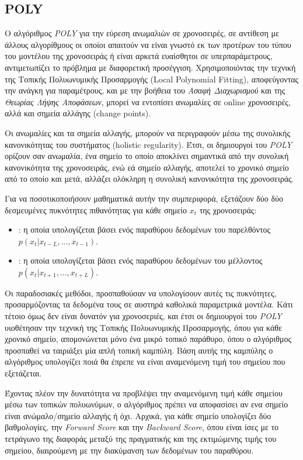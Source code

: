 \subsection{POLY}
Ο αλγόριθμος \emph{POLY} \cite{li2007unifying} για την εύρεση ανωμαλιών σε χρονοσειρές, σε αντίθεση με άλλους αλγορίθμους οι οποίοι απαιτούν να είναι γνωστό εκ των προτέρων του τύπου του μοντέλου της χρονοσειράς ή είναι αρκετά ευαίσθητοι σε υπερπαράμετρους, αντιμετωπίζει το πρόβλημα με διαφορετική προσέγγιση. Χρησιμοποιόντας την τεχνική της Τοπικής Πολυωνυμικής Προσαρμογής (Local Polynomial Fitting), αποφεύγοντας την ανάγκη για παραμέτρους, και με την βοήθεια του \emph{Ασαφή Διαχωρισμού} και της \emph{Θεωρίας Λήψης Αποφάσεων}, μπορεί να εντοπίσει ανωμαλίες σε online χρονοσειρές, αλλά και σημεία αλλάγης (change points).

Οι ανωμαλίες και τα σημεία αλλαγής, μπορούν να περιγραφούν μέσω της συνολικής κανονικότητας του συστήματος (holistic regularity). Έτσι, οι δημιουργοί του \emph{POLY} ορίζουν σαν ανωμαλία, ένα σημείο το οποίο αποκλίνει σημαντικά από την συνολική κανονικότητα της χρονοσειράς, ενώ εά σημείο αλλαγής, αποτελεί το χρονικό σημείο από το οποίο και μετά, αλλάζει ολόκληρη η συνολική κανονικότητα της χρονοσειράς.

Για να ποσοτικοποιήσουν μαθηματικά αυτήν την συμπεριφορά, εξετάζουν δύο δύο δεσμευμένες πυκνότητες πιθανότητας για κάθε σημείο $x_t$ της χρονοσειράς:
\begin{itemize}
    \item {}: η οποία υπολογίζεται βάσει ενός παραθύρου δεδομένων του παρελθόντος $p(x_t|x_{t-L},...,x_{t-1})$.
    \item {}: η οποία υπολογίζεται βάσει ενός παραθύρου δεδομένων του μέλλοντος $p(x_t|x_{t+1},...,x_{t+L})$.
\end{itemize}

Οι παραδοσιακές μεθόδοι, προσπαθούσαν να υπολογίσουν αυτές τις πυκνότητες, προσαρμόζοντας τα δεδομένα τους σε αυστηρά καθολικά παραμετρικά μοντέλα. Κάτι τέτοιο όμως δεν είναι δυνατόν για χρονοσεριές, και έτσι οι δημιουργοί του \emph{POLY} υιοθέτησαν την τεχνική της Τοπικής Πολυωνυμικής Προσαρμογής, όπου για κάθε χρονικό σημείο, απομονώνεται μόνο ένα μικρό τοπικό παράθυρο, όπου ο αλγόριθμος προσπαθεί να ταιριάξει μία απλή τοπική καμπύλη. Βάση αυτής της καμπύλης ο αλγόριθμος υπολογίζει ποιά θα έπρεπε να είναι αναμενόμενη τιμή του σημείου που εξετάζεται.

Έχοντας πλέον την δυνατότητα να προβλέψει την αναμενόμενη τιμή κάθε σημείου μέσω των τοπικών πολυωνύμων, ο αλγόριθμος πρέπει να αποφασίσει αν ενα σημείο είναι ανώμαλο/σημείο αλλαγής ή όχι. Αρχικά, για κάθε σημείο υπολογίζει δύο βαθμολογίες, την \emph{Forward Score} και την \emph{Backward Score}, όπου είναι ίσες με το τετράγωνο της διαφοράς μεταξύ της πραγματικής και της εκτιμώμενης τιμής του σημείου, διαιρούμενη με την διακύμανση των δεδομένων του παραθύρου.

